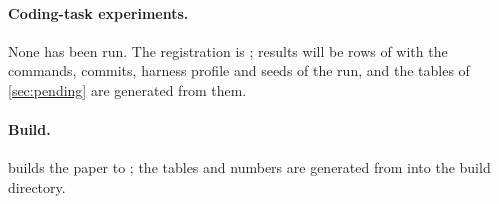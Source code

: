 \paragraph{Coding-task experiments.} None has been run. The registration is
; results will be rows of  with the commands,
commits, harness profile and seeds of the run, and the tables of \cref{sec:pending} are generated
from them.

\paragraph{Build.}  builds the paper to
; the tables and numbers are generated from  into the
build directory.
